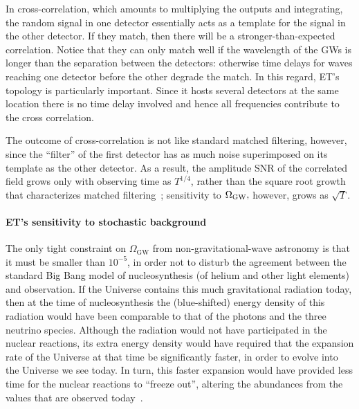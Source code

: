 In cross-correlation, which amounts to multiplying the outputs and integrating, the 
random signal in one detector essentially acts as a template for the signal in the 
other detector. If they match, then there will be a stronger-than-expected correlation. 
Notice that they can only match well if the wavelength of the GWs is longer
than the separation between the detectors: otherwise time delays for waves reaching one 
detector before the other degrade the match. In this regard, ET's topology is 
particularly important. Since it hosts several detectors at the same location there
is no time delay involved and hence all frequencies contribute to the cross correlation.

The outcome of cross-correlation is not like standard 
matched filtering, however, since the ``filter'' of the first detector has as much 
noise superimposed on its template as the other detector. As a result, the 
amplitude SNR of the correlated field grows only with observing time as $T^{1/4}$, 
rather than the square root growth that characterizes matched filtering~\cite{Thorne1987};
sensitivity to $\Omega_{\rm GW},$ however, grows as $\sqrt{T}.$ 
\paragraph{ET's sensitivity to stochastic background}
The only tight constraint on  
$\Omega_{\text{GW}}$ from non-gravitational-wave astronomy is that it 
must be smaller than $10^{-5}$, in order not to disturb the agreement 
between the standard Big Bang model of nucleosynthesis (of helium and
other light elements) and observation. If the Universe contains
this much gravitational radiation today, then at the time of
nucleosynthesis the (blue-shifted) energy density of this radiation
would have been comparable to that of the photons and the three
neutrino species. Although the radiation would not have participated
in the nuclear reactions, its extra energy density would have required
that the expansion rate of the Universe at that time be
significantly faster, in order to evolve into the Universe we see
today. In turn, this faster expansion would have provided less time
for the nuclear reactions to ``freeze out'', altering the abundances
from the values that are observed today~\cite{Pagel:2000,Steigman:2007xt}. 

